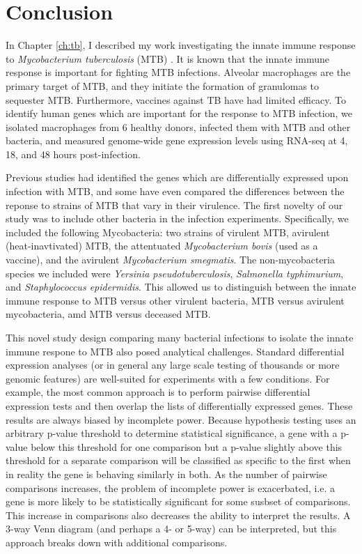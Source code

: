 \chapter{Conclusion}\label{conclusion}

In Chapter \ref{ch:tb}, I described my work investigating the innate immune
response to \emph{Mycobacterium tuberculosis} (MTB) \citep{Blischak2015}. It is
known that the innate immune response is important for fighting MTB
infections. Alveolar macrophages are the primary target of MTB, and they
initiate the formation of granulomas to sequester MTB. Furthermore, vaccines
against TB have had limited efficacy. To identify human genes which are
important for the response to MTB infection, we isolated macrophages from 6
healthy donors, infected them with MTB and other bacteria, and measured
genome-wide gene expression levels using RNA-seq at 4, 18, and 48 hours
post-infection.

Previous studies had identified the genes which
are differentially expressed upon infection with MTB, and some have
even compared the differences between the reponse to strains of MTB
that vary in their virulence. The first novelty of our study was to
include other bacteria in the infection experiments. Specifically, we
included the following Mycobacteria: two strains of virulent MTB,
avirulent (heat-inavtivated) MTB, the attentuated \emph{Mycobacterium
  bovis} (used as a vaccine), and the avirulent \emph{Mycobacterium
  smegmatis}. The non-mycobacteria species we included were
\emph{Yersinia pseudotuberculosis}, \emph{Salmonella typhimurium}, and
\emph{Staphylococcus epidermidis}. This allowed us to distinguish
between the innate immune response to MTB versus other virulent
bacteria, MTB versus avirulent mycobacteria, amd MTB versus deceased
MTB.

This novel study design comparing many bacterial infections to isolate
the innate immune respone to MTB also posed analytical
challenges. Standard differential expression analyses (or in general
any large scale testing of thousands or more genomic features) are
well-suited for experiments with a few conditions. For example, the
most common approach is to perform pairwise differential expression
tests and then overlap the lists of differentially expressed
genes. These results are always biased by incomplete power. Because
hypothesis testing uses an arbitrary p-value threshold to determine
statistical significance, a gene with a p-value below this threshold
for one comparison but a p-value slightly above this threshold for a
separate comparison will be classified as specific to the first when
in reality the gene is behaving similarly in both. As the number of
pairwise comparisons increases, the problem of incomplete power is
exacerbated, i.e. a gene is more likely to be statistically
significant for some susbset of comparisons. This increase in
comparisons also decreases the ability to interpret the results. A
3-way Venn diagram (and perhaps a 4- or 5-way) can be interpreted, but
this approach breaks down with additional comparisons.

